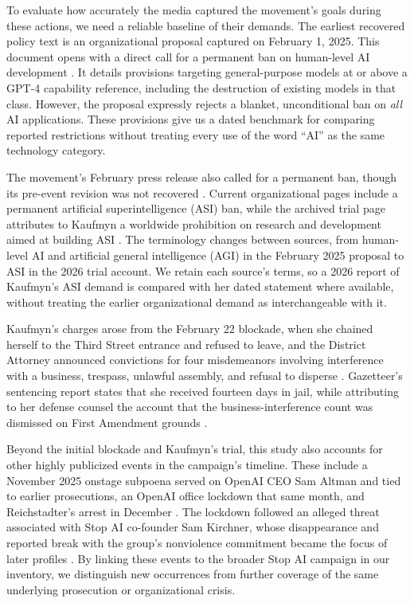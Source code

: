 \documentclass[11pt]{article}
\begin{document}
To evaluate how accurately the media captured the movement's goals during these actions, we need a reliable baseline of their demands. The earliest recovered policy text is an organizational proposal captured on February 1, 2025. This document opens with a direct call for a permanent ban on human-level AI development \citep{stopproposal}. It details provisions targeting general-purpose models at or above a GPT-4 capability reference, including the destruction of existing models in that class. However, the proposal expressly rejects a blanket, unconditional ban on \textit{all} AI applications. These provisions give us a dated benchmark for comparing reported restrictions without treating every use of the word ``AI'' as the same technology category.

The movement's February press release also called for a permanent ban, though its pre-event revision was not recovered \citep{stoprelease}. Current organizational pages include a permanent artificial superintelligence (ASI) ban, while the archived trial page attributes to Kaufmyn a worldwide prohibition on research and development aimed at building ASI \citep{stopabout,stopstatement,stoptrial}. The terminology changes between sources, from human-level AI and artificial general intelligence (AGI) in the February 2025 proposal to ASI in the 2026 trial account. We retain each source's terms, so a 2026 report of Kaufmyn's ASI demand is compared with her dated statement where available, without treating the earlier organizational demand as interchangeable with it.

Kaufmyn's charges arose from the February 22 blockade, when she chained herself to the Third Street entrance and refused to leave, and the District Attorney announced convictions for four misdemeanors involving interference with a business, trespass, unlawful assembly, and refusal to disperse \citep{da}. Gazetteer's sentencing report states that she received fourteen days in jail, while attributing to her defense counsel the account that the business-interference count was dismissed on First Amendment grounds \citep{hayes}.

Beyond the initial blockade and Kaufmyn's trial, this study also accounts for other highly publicized events in the campaign's timeline. These include a November 2025 onstage subpoena served on OpenAI CEO Sam Altman and tied to earlier prosecutions, an OpenAI office lockdown that same month, and Reichstadter's arrest in December \citep{subpoena,wired,krans}. The lockdown followed an alleged threat associated with Stop AI co-founder Sam Kirchner, whose disappearance and reported break with the group's nonviolence commitment became the focus of later profiles \citep{wired,atlantic}. By linking these events to the broader Stop AI campaign in our inventory, we distinguish new occurrences from further coverage of the same underlying prosecution or organizational crisis.
\end{document}
